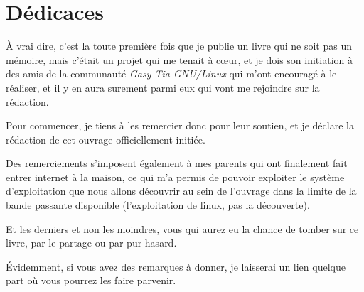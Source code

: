 \chapter*{Dédicaces}

À vrai dire, c'est la toute première fois que je publie un livre qui ne soit
pas un mémoire, mais c'était un projet qui me tenait à c\oe{}ur, et je dois son
initiation à des amis de la communauté \emph{Gasy Tia GNU/Linux} qui m'ont
encouragé à le réaliser, et il y en aura surement parmi eux qui vont me rejoindre
sur la rédaction.

Pour commencer, je tiens à les remercier donc pour leur soutien, et je déclare
la rédaction de cet ouvrage officiellement initiée.

Des remerciements s'imposent également à mes parents qui ont finalement fait
entrer internet à la maison, ce qui m'a permis de pouvoir exploiter le système
d'exploitation que nous allons découvrir au sein de l'ouvrage dans la limite de
la bande passante disponible (l'exploitation de linux, pas la découverte).

Et les derniers et non les moindres, vous qui aurez eu la chance de tomber sur
ce livre, par le partage ou par pur hasard.

Évidemment, si vous avez des remarques à donner, je laisserai un lien quelque
part où vous pourrez les faire parvenir.
